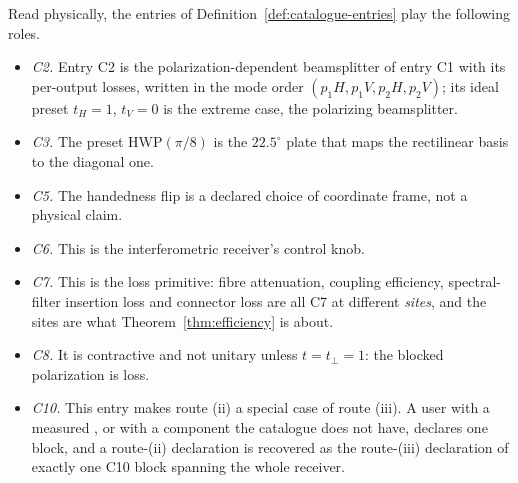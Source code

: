 
\begin{remark}\label{rem:entry-roles}
Read physically, the entries of Definition~\ref{def:catalogue-entries} play
the following roles.
\begin{itemize}[leftmargin=1.6em]
\item \emph{C2.} Entry C2 is the polarization-dependent beamsplitter of
  entry C1 with its per-output losses, written in the mode order
  $(p_1H,p_1V,p_2H,p_2V)$; its ideal preset $t_H=1$, $t_V=0$ is the extreme
  case, the polarizing beamsplitter.
\item \emph{C3.} The preset $\mathrm{HWP}(\pi/8)$ is the $22.5^{\circ}$
  plate that maps the rectilinear basis to the diagonal one.
\item \emph{C5.} The handedness flip is a declared choice of coordinate frame,
  not a physical claim.
\item \emph{C6.} This is the interferometric receiver's control knob.
\item \emph{C7.} This is the loss primitive: fibre attenuation, coupling
  efficiency, spectral-filter insertion loss and connector loss are all C7 at
  different \emph{sites}, and the sites are what Theorem~\ref{thm:efficiency} is
  about.
\item \emph{C8.} It is contractive and not unitary unless $t=t_\perp=1$: the
  blocked polarization is loss.
\item \emph{C10.} This entry makes route (ii) a special case of route (iii).
  A user with a measured , or with a component the
  catalogue does not have, declares one block, and a route-(ii) declaration
  is recovered as the route-(iii) declaration of exactly one C10 block
  spanning the whole receiver.
\end{itemize}
\end{remark}
